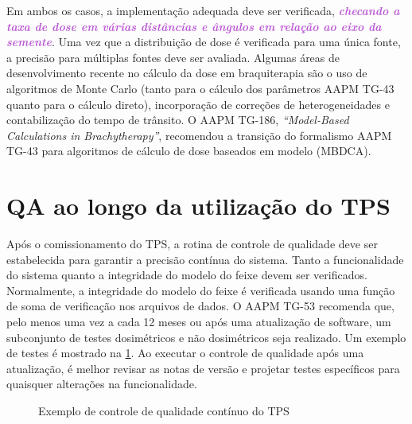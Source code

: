\documentclass[11pt,a4paper]{article}
\newcounter{exemplo}
\begin{document}
	Em ambos os casos, a implementação adequada deve ser verificada, \textcolor{MediumOrchid}{\textbf{\textit{checando a taxa de dose em várias distâncias e ângulos em relação ao eixo da semente}}}. Uma vez que a distribuição de dose é verificada para uma única fonte, a precisão para múltiplas fontes deve ser avaliada. Algumas áreas de desenvolvimento recente no cálculo da dose em braquiterapia são o uso de algoritmos de Monte Carlo (tanto para o cálculo dos parâmetros AAPM TG-43 quanto para o cálculo direto), incorporação de correções de heterogeneidades e contabilização do tempo de trânsito. O AAPM TG-186, \textit{``Model-Based Calculations in Brachytherapy''}, recomendou a transição do formalismo AAPM TG-43 para algoritmos de cálculo de dose baseados em modelo (MBDCA).

\section{QA ao longo da utilização do TPS}

	Após o comissionamento do TPS, a rotina de controle de qualidade deve ser estabelecida para garantir a precisão contínua do sistema. Tanto a funcionalidade do sistema quanto a integridade do modelo do feixe devem ser verificados. Normalmente, a integridade do modelo do feixe é verificada usando uma função de soma de verificação nos arquivos de dados. O AAPM TG-53 recomenda que, pelo menos uma vez a cada 12 meses ou após uma atualização de software, um subconjunto de testes dosimétricos e não dosimétricos seja realizado. Um exemplo de testes é mostrado na \ref{fig:qaTps}. Ao executar o controle de qualidade após uma atualização, é melhor revisar as notas de versão e projetar testes específicos para quaisquer alterações na funcionalidade.

	\begin{figure}[h]
		\centering
		\caption{Exemplo de controle de qualidade contínuo do TPS}
		\label{fig:qaTps}
	\end{figure}
\end{document}
